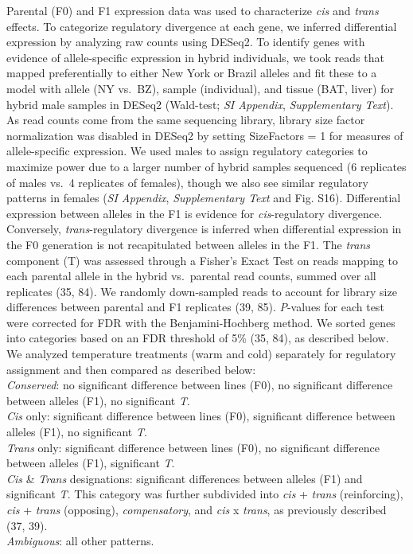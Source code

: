 \documentclass[9pt,twocolumn,twoside,lineno]{pnas-new}
\begin{document}
Parental (F0) and F1 expression data was used to characterize \emph{cis}
and \emph{trans} effects. To categorize regulatory divergence at each
gene, we inferred differential expression by analyzing raw counts using
DESeq2. To identify genes with evidence of allele-specific expression in
hybrid individuals, we took reads that mapped preferentially to either
New York or Brazil alleles and fit these to a model with allele (NY
vs.~BZ), sample (individual), and tissue (BAT, liver) for hybrid male
samples in DESeq2 (Wald-test; \emph{SI Appendix}, \emph{Supplementary
Text}). As read counts come from the same sequencing library, library
size factor normalization was disabled in DESeq2 by setting SizeFactors
= 1 for measures of allele-specific expression. We used males to assign
regulatory categories to maximize power due to a larger number of hybrid
samples sequenced (6 replicates of males vs.~4 replicates of females),
though we also see similar regulatory patterns in females (\emph{SI
Appendix}, \emph{Supplementary Text} and Fig. S16). Differential
expression between alleles in the F1 is evidence for
\emph{cis}-regulatory divergence. Conversely, \emph{trans}-regulatory
divergence is inferred when differential expression in the F0 generation
is not recapitulated between alleles in the F1. The \emph{trans}
component (T) was assessed through a Fisher's Exact Test on reads
mapping to each parental allele in the hybrid vs.~parental read counts,
summed over all replicates (35, 84). We randomly down-sampled reads to
account for library size differences between parental and F1 replicates
(39, 85). \emph{P}-values for each test were corrected for FDR with the
Benjamini-Hochberg method. We sorted genes into categories based on an
FDR threshold of 5\% (35, 84), as described below. We analyzed
temperature treatments (warm and cold) separately for regulatory
assignment and then compared as described below:\\
\indent \textit{Conserved}: no significant difference between lines
(F0), no significant difference between alleles (F1), no significant
\textit{T}.\\
\indent \textit{Cis} only: significant difference between lines (F0),
significant difference between alleles (F1), no significant
\textit{T}.\\
\indent \textit{Trans} only: significant difference between lines (F0),
no significant difference between alleles (F1), significant
\textit{T}.\\
\indent \emph{Cis} {\&} \emph{Trans} designations: significant
differences between alleles (F1) and significant \textit{T}. This
category was further subdivided into \emph{cis} + \emph{trans}
(reinforcing), \emph{cis} + \emph{trans} (opposing),
\textit{compensatory}, and \emph{cis} x \emph{trans}, as previously
described (37, 39).\\
\indent \emph{Ambiguous}: all other patterns.
\end{document}
